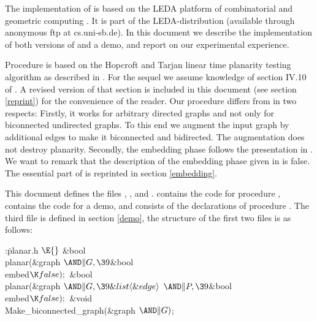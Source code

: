 The implementation of  is based on the LEDA platform of
combinatorial
and geometric computing \cite{LEDA-Manual,Mehlhorn-Naeher:LEDA}. It is part of
the LEDA-distribution (available through anonymous ftp at cs.uni-sb.de). In
this document we describe the implementation of both versions of  and
a demo, and report on our experimental experience.

Procedure  is based on the
Hopcroft and Tarjan linear time planarity testing algorithm as
described in \cite[section IV.10]{Me:book}. For the sequel we assume
knowledge of section IV.10 of \cite{Me:book}. A revised version of that section
is included in this document (see section \ref{reprint}) for the convenience
of the reader. Our procedure  differs from \cite[section
IV.10]{Me:book}
in two respects: Firstly, it works for arbitrary directed graphs and
not only for biconnected
undirected graphs. To this end we augment the input graph by additional edges
to make it biconnected and bidirected. The augmentation does not destroy
planarity. Secondly, the embedding
phase follows the
presentation in \cite{Mehlhorn-Mutzel:embedding}. We want to remark that the
description of the embedding phase given
in \cite[section IV.10]{Me:book} is false.
The essential part of \cite{Mehlhorn-Mutzel:embedding} is reprinted in
section \ref{embedding}.


This document defines the files , ,
and .
 contains the code for procedure , 
contains the code for a demo, and  consists of the
declarations of procedure .
The third file is defined in section \ref{demo}, the structure of the first two
files
is as follows:

\Y\B\4:\.{planar.h }\X${}\E{}$\6
\&{bool} \\{planar}(\&{graph} ${}{\AND}\|G,\39{}$\&{bool} \\{embed}${}\K%
\\{false});{}$\6
\&{bool} \\{planar}(\&{graph} ${}{\AND}\|G,\39\&{list}\langle\&{edge}\rangle{}$
${}{\AND}\|P,\39{}$\&{bool} \\{embed}${}\K\\{false});{}$\6
\&{void} \\{Make\_biconnected\_graph}(\&{graph} ${}{\AND}\|G){}$;\par
\fi


